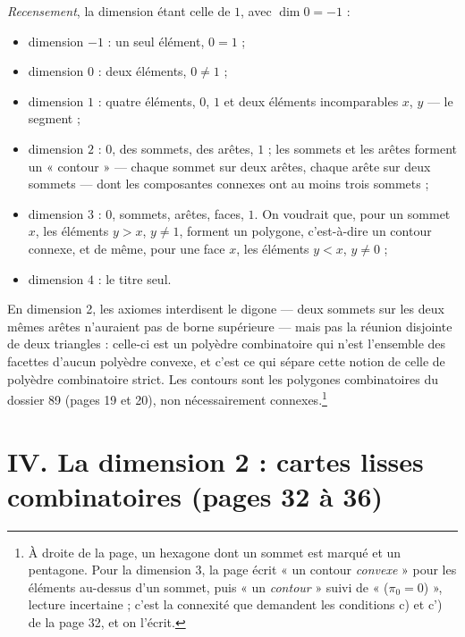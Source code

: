 \documentclass[11pt,a4paper]{article}
\begin{document}
\emph{Recensement}, la dimension étant celle de $1$, avec $\dim 0 = -1$ :
\begin{itemize}
\item dimension $-1$ : un seul élément, $0 = 1$ ;
\item dimension $0$ : deux éléments, $0 \neq 1$ ;
\item dimension $1$ : quatre éléments, $0$, $1$ et deux éléments incomparables
$x$, $y$ --- le segment ;
\item dimension $2$ : $0$, des sommets, des arêtes, $1$ ; les sommets et les
arêtes forment un « contour » --- chaque sommet sur deux arêtes, chaque arête
sur deux sommets --- dont les composantes connexes ont au moins trois sommets ;
\item dimension $3$ : $0$, sommets, arêtes, faces, $1$. On voudrait que, pour un
sommet $x$, les éléments $y > x$, $y \neq 1$, forment un polygone, c'est-à-dire un
contour connexe, et de même, pour une face $x$, les éléments $y < x$,
$y \neq 0$ ;
\item dimension $4$ : le titre seul.
\end{itemize}


En dimension 2, les axiomes interdisent le digone --- deux sommets sur les deux
mêmes arêtes n'auraient pas de borne supérieure --- mais pas la réunion
disjointe de deux triangles : celle-ci est un polyèdre combinatoire qui n'est
l'ensemble des facettes d'aucun polyèdre convexe, et c'est ce qui sépare cette
notion de celle de polyèdre combinatoire strict. Les contours sont les
polygones combinatoires du dossier 89 (pages 19 et 20), non nécessairement
connexes.\footnote{À droite de la page, un hexagone dont un sommet est marqué et
un pentagone. Pour la dimension 3, la page écrit « un contour \emph{convexe} »
pour les éléments au-dessus d'un sommet, puis « un \emph{contour} » suivi de
« ($\pi_{0} = 0$) », lecture incertaine ; c'est la connexité que demandent les
conditions c) et c') de la page 32, et on l'écrit.}

\section*{IV. La dimension 2 : cartes lisses combinatoires (pages 32 à 36)}
\end{document}
